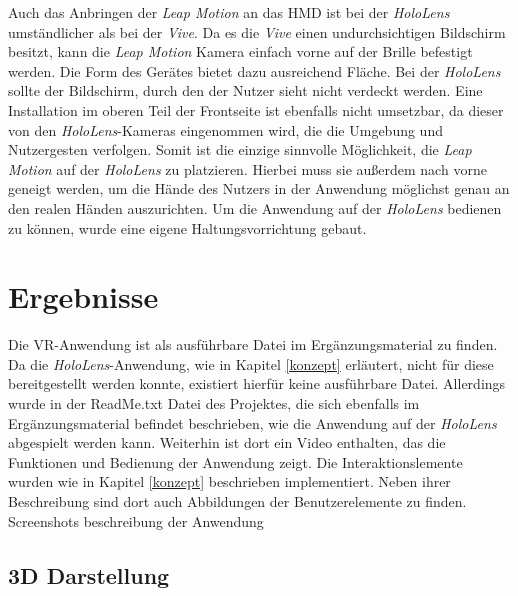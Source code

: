 Auch das Anbringen der \textit{Leap Motion} an das HMD ist bei der \textit{HoloLens} umständlicher als bei der \textit{Vive}. 
Da es die \textit{Vive} einen undurchsichtigen Bildschirm besitzt, kann die \textit{Leap Motion} Kamera einfach vorne auf der Brille befestigt werden. Die Form des Gerätes bietet dazu ausreichend Fläche.
Bei der \textit{HoloLens} sollte der Bildschirm, durch den der Nutzer sieht nicht verdeckt werden. Eine Installation im oberen Teil der Frontseite ist ebenfalls nicht umsetzbar, da dieser von den \textit{HoloLens}-Kameras eingenommen wird, die die Umgebung und Nutzergesten verfolgen.
Somit ist die einzige sinnvolle Möglichkeit, die \textit{Leap Motion} auf der \textit{HoloLens} zu platzieren. Hierbei muss sie außerdem nach vorne geneigt werden, um die Hände des Nutzers in der Anwendung möglichst genau an den realen Händen auszurichten. 
Um die Anwendung auf der \textit{HoloLens} bedienen zu können, wurde eine eigene Haltungsvorrichtung gebaut.



\section{Ergebnisse}
\label{ergebnisse}

Die VR-Anwendung ist als ausführbare Datei im Ergänzungsmaterial zu finden. Da die \textit{HoloLens}-Anwendung, wie in Kapitel \ref{konzept} erläutert, nicht für diese bereitgestellt werden konnte, existiert hierfür keine ausführbare Datei. Allerdings wurde in der ReadMe.txt Datei des Projektes, die sich ebenfalls im Ergänzungsmaterial befindet beschrieben, wie die Anwendung auf der \textit{HoloLens} abgespielt werden kann. 
Weiterhin ist dort ein Video enthalten, das die Funktionen und Bedienung der Anwendung zeigt.
Die Interaktionslemente wurden wie in Kapitel \ref{konzept} beschrieben implementiert. Neben ihrer Beschreibung sind dort auch Abbildungen der Benutzerelemente zu finden. 
Screenshots
beschreibung der Anwendung

\subsection{3D Darstellung}

